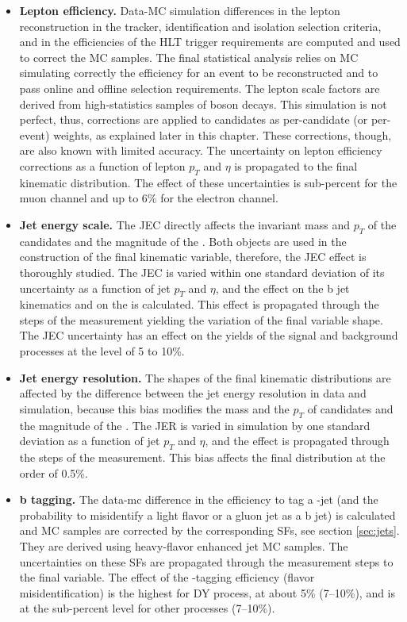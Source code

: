 \begin{small}
\begin{itemize}

\item{\bf Lepton efficiency.} 
Data-MC simulation differences in the lepton reconstruction in the tracker, identification and isolation selection criteria, and in the efficiencies of the HLT trigger requirements are computed and used to correct the MC samples. The final statistical analysis relies on MC simulating correctly the efficiency for an event to be reconstructed and to pass online and offline selection requirements. The lepton scale factors are derived from high-statistics samples of \PZ boson decays. This simulation is not perfect, thus, corrections are applied to candidates as per-candidate (or per-event) weights, as explained later in this chapter. These corrections, though, are also known with limited accuracy. The uncertainty on lepton efficiency corrections as a function of lepton $p_T$ and $\eta$ is propagated to the final kinematic distribution. The effect of these uncertainties is sub-percent for the muon channel and up to 6\% for the electron channel.

\item{\bf Jet energy scale.}
The JEC directly affects the invariant mass and $p_T$ of the \HBB candidates and the magnitude of the \PTslash. Both objects are used in the construction of the final kinematic variable, therefore, the JEC effect is thoroughly studied. The JEC is varied within one standard deviation of its uncertainty as a function of jet $p_T$ and $\eta$, and the effect on the b jet kinematics and on the \PTslash is calculated. This effect is propagated through the steps of the measurement yielding the variation of the final variable shape. The JEC uncertainty has an effect on the yields of the signal and background processes at the level of 5 to 10\%.

\item{\bf Jet energy resolution.} 
The shapes of the final kinematic distributions are affected by the difference between the jet energy
  resolution in data and simulation, because this bias modifies the mass and the $p_T$ of \HBB candidates and the magnitude of the \PTslash. The JER is varied in simulation by one standard deviation as a function of jet $p_T$ and $\eta$, and the effect is propagated through the steps of the measurement. This bias affects the final distribution at the order of 0.5\%.

\item{\bf b tagging.}
The data-mc difference in the efficiency to tag a \PQb-jet (and the probability to misidentify a light flavor or a gluon jet as a b jet) is calculated and MC samples are corrected by the corresponding SFs, see section \ref{sec:jets}. They are derived using heavy-flavor enhanced jet MC samples. The uncertainties on these SFs are propagated through the measurement steps to the final variable. The effect of the \PQb-tagging efficiency (flavor misidentification) is the highest for DY process, at about 5\% (7--10\%), and is at the sub-percent level for other processes (7--10\%). 


\end{itemize}
\end{small}

